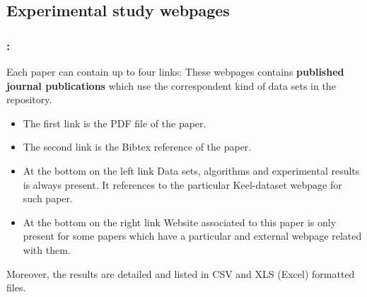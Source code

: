 \documentclass{beamer}
\begin{document}
\begin{CJK*}{UTF8}{bsmi}
\subsection{Experimental study webpages}



\begin{frame}
	\frametitle{\insertsection : \insertsubsection}
	
	\begin{block}{Each paper can contain up to four links: }
		These webpages contains \textbf{published journal publications} which use the correspondent kind of data sets in the repository.
		\begin{itemize}
			\item The first link is the PDF file of the paper.
			\item The second link is the Bibtex reference of the paper.
			\item At the bottom on the left link Data sets, algorithms and experimental results is always present. It references to the particular Keel-dataset webpage for such paper.
			\item At the bottom on the right link Website associated to this paper is only present for some papers which have a particular and external webpage related with them.
		\end{itemize}
	Moreover, the results are detailed and listed in CSV and XLS (Excel) formatted files.
	\end{block}
\end{frame}


\end{CJK*}
\end{document}
